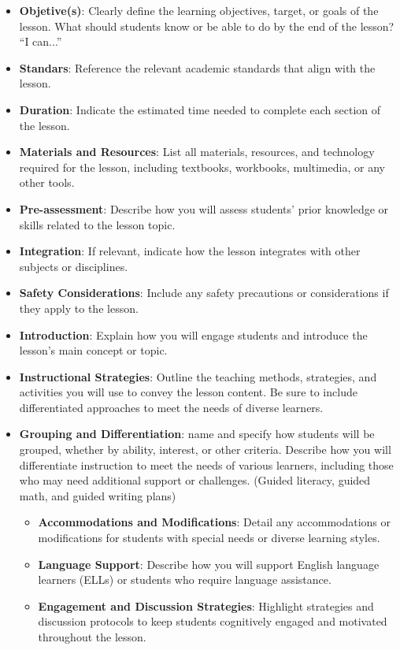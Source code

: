 \documentclass[11pt, letterpaper]{article}
\begin{document}
\begin{itemize}
\item \textbf{Objetive(s)}: Clearly define the learning objectives, target, or goals of the lesson. What should students know or be able to do by the end of the lesson? “I can...”
\item \textbf{Standars}: Reference the relevant academic standards that align with the lesson.
\item \textbf{Duration}: Indicate the estimated time needed to complete each section of the lesson.
\item \textbf{Materials and Resources}: List all materials, resources, and technology required for the lesson, including textbooks, workbooks, multimedia, or any other tools.
\item \textbf{Pre-assessment}: Describe how you will assess students' prior knowledge or skills related to the lesson topic.
\item \textbf{Integration}: If relevant, indicate how the lesson integrates with other subjects or disciplines.
\item \textbf{Safety Considerations}: Include any safety precautions or considerations if they apply to the lesson.
\item \textbf{Introduction}: Explain how you will engage students and introduce the lesson's main concept or topic.
\item \textbf{Instructional Strategies}: Outline the teaching methods, strategies, and activities you will use to convey the lesson content. Be sure to include differentiated approaches to meet the needs of diverse learners.
\item \textbf{Grouping and Differentiation}: name and specify how students will be grouped, whether by ability, interest, or other criteria. Describe how you will differentiate instruction to meet the needs of various learners, including those who may need additional support or challenges. (Guided literacy, guided math, and guided writing plans)
\begin{itemize}
\item \textbf{Accommodations and Modifications}: Detail any accommodations or modifications for students with special needs or diverse learning styles.
\item \textbf{Language Support}: Describe how you will support English language learners (ELLs) or students who require language assistance.
\item \textbf{Engagement and Discussion Strategies}: Highlight strategies and discussion protocols to keep students cognitively engaged and motivated throughout the lesson.

\end{itemize}
\end{itemize}
\end{document}
